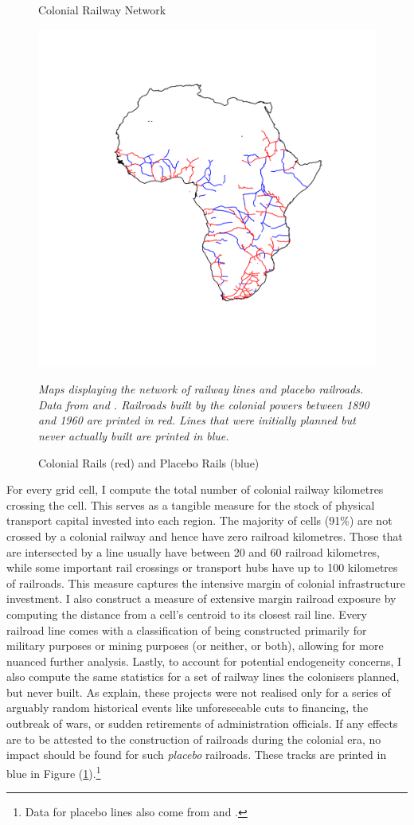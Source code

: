 \documentclass[11pt, oneside]{article}   	%
\let\oldref\ref
\renewcommand{\ref}[1]{(\oldref{#1})}
\newcommand{\mysubcaption}[1]{
\justify
\begin{spacing}{0.7}
\textit{\footnotesize #1}
\end{spacing}}
\begin{document}
\begin{figure}
\centering
\caption{Colonial Railway Network}
\includegraphics[width=.6\textwidth,trim={10cm 11cm 6cm 10cm},clip]{../../Analysis/output/other_maps/all_rails.png}
\caption{Colonial Rails (red) and Placebo Rails (blue)}
\label{fig:Railroad_Map}
\mysubcaption{Maps displaying the network of railway lines and placebo railroads. Data from \cite{Jedwab_PermanentEffectsTransportation_2016a} and \cite{Herranz-Loncan_publicbenefitRailways_2017}. Railroads built by the colonial powers between 1890 and 1960 are printed in red. Lines that were initially planned but never actually built are printed in blue.}
\end{figure}

For every grid cell, I compute the total number of colonial railway kilometres crossing the cell. This serves as a tangible measure for the stock of physical transport capital invested into each region. The majority of cells (91\%) are not crossed by a colonial railway and hence have zero railroad kilometres. Those that are intersected by a line usually have between 20 and 60 railroad kilometres, while some important rail crossings or transport hubs have up to 100 kilometres of railroads. This measure captures the intensive margin of colonial infrastructure investment. I also construct a measure of extensive margin railroad exposure by computing the distance from a cell's centroid to its closest rail line. Every railroad line comes with a classification of being constructed primarily for military purposes or mining purposes (or neither, or both), allowing for more nuanced further analysis. Lastly, to account for potential endogeneity concerns, I also compute the same statistics for a set of railway lines the colonisers planned, but never built. As \cite{Jedwab_PermanentEffectsTransportation_2016a} explain, these projects were not realised only for a series of arguably random historical events like unforeseeable cuts to financing, the outbreak of wars, or sudden retirements of administration officials. If any effects are to be attested to the construction of railroads during the colonial era, no impact should be found for such \emph{placebo} railroads. These tracks are printed in blue in Figure \ref{fig:Railroad_Map}.\footnote{Data for placebo lines also come from \cite{Jedwab_PermanentEffectsTransportation_2016a} and \cite{Herranz-Loncan_publicbenefitRailways_2017}.}
\end{document}
